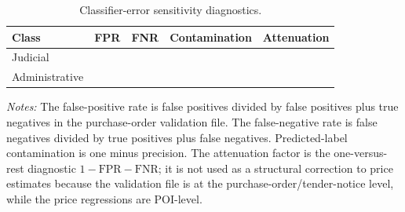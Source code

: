 \begin{table}[ht]
\centering
\caption{Classifier-error sensitivity diagnostics.}
\label{tab:classifier_error_sensitivity}
\begin{threeparttable}
\small
\begin{tabular}{lcccc}
\toprule
Class & FPR & FNR & Contamination & Attenuation \\
\midrule
Judicial & \BPregexFprJudPct{} & \BPregexFnrJudPct{} & \BPregexContamJudPct{} & \BPregexAttenJud{} \\
Administrative & \BPregexFprAdmPct{} & \BPregexFnrAdmPct{} & \BPregexContamAdmPct{} & \BPregexAttenAdm{} \\
\bottomrule
\end{tabular}
\begin{tablenotes}[flushleft]\footnotesize
\item \textit{Notes:} The false-positive rate is false positives divided by false positives plus true negatives in the purchase-order validation file. The false-negative rate is false negatives divided by true positives plus false negatives. Predicted-label contamination is one minus precision. The attenuation factor is the one-versus-rest diagnostic $1-\mathrm{FPR}-\mathrm{FNR}$; it is not used as a structural correction to price estimates because the validation file is at the purchase-order/tender-notice level, while the price regressions are POI-level.
\end{tablenotes}
\end{threeparttable}
\end{table}
